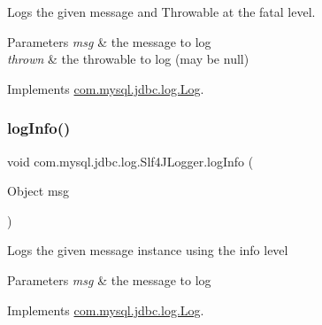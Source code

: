 Logs the given message and Throwable at the \textquotesingle{}fatal\textquotesingle{} level.


\begin{DoxyParams}{Parameters}
{\em msg} & the message to log \\
\hline
{\em thrown} & the throwable to log (may be null) \\
\hline
\end{DoxyParams}


Implements \mbox{\hyperlink{interfacecom_1_1mysql_1_1jdbc_1_1log_1_1_log_a6da5bf2be5d9c63cfd192ab457aaff92}{com.\+mysql.\+jdbc.\+log.\+Log}}.

\mbox{\label{classcom_1_1mysql_1_1jdbc_1_1log_1_1_slf4_j_logger_a383e3eb38412b93808048a0df9f74083}} 
\subsubsection{\texorpdfstring{log\+Info()}{logInfo()}\hspace{0.1cm}{\footnotesize\ttfamily [1/2]}}
{\footnotesize\ttfamily void com.\+mysql.\+jdbc.\+log.\+Slf4\+J\+Logger.\+log\+Info (\begin{DoxyParamCaption}\item[{Object}]{msg }\end{DoxyParamCaption})}

Logs the given message instance using the \textquotesingle{}info\textquotesingle{} level


\begin{DoxyParams}{Parameters}
{\em msg} & the message to log \\
\hline
\end{DoxyParams}


Implements \mbox{\hyperlink{interfacecom_1_1mysql_1_1jdbc_1_1log_1_1_log_a6a380b7638c3ebe1251d4e07cb7f4569}{com.\+mysql.\+jdbc.\+log.\+Log}}.

\mbox{\label{classcom_1_1mysql_1_1jdbc_1_1log_1_1_slf4_j_logger_a5dd28a46f364c29f13314a76c075b2d5}} 
